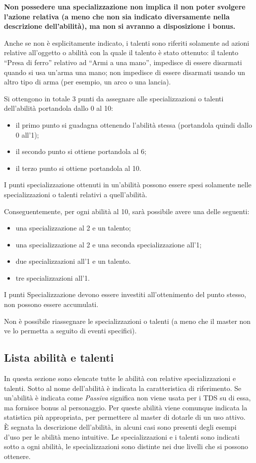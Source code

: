 \documentclass[../manuale_main.tex]{subfiles}
\begin{document}
\textbf{Non possedere una specializzazione non implica il non poter svolgere l'azione relativa (a meno che non sia indicato diversamente nella descrizione dell'abilità), ma non si avranno a disposizione i bonus.}

Anche se non è esplicitamente indicato, i talenti sono riferiti solamente ad azioni relative all'oggetto o abilità con la quale il talento è stato ottenuto: il talento ``Presa di ferro” relativo ad ``Armi a una mano”, impedisce di essere disarmati quando si usa un'arma una mano; non impedisce di essere disarmati usando un altro tipo di arma (per esempio, un arco o una lancia).

Si ottengono in totale 3 punti da assegnare alle specializzazioni o talenti dell'abilità portandola dallo 0 al 10:
\begin{itemize}
\item il primo punto si guadagna ottenendo l'abilità stessa (portandola quindi dallo 0 all'1);
\item il secondo punto si ottiene portandola al 6;
\item il terzo punto si ottiene portandola al 10.
\end{itemize}
I punti specializzazione ottenuti in un'abilità possono essere spesi solamente nelle specializzazioni o talenti relativi a quell'abilità.

Conseguentemente, per ogni abilità al 10, sarà possibile avere una delle seguenti:
\begin{itemize}
\item una specializzazione al 2 e un talento;
\item una specializzazione al 2 e una seconda specializzazione all'1;
\item due specializzazioni all'1 e un talento.
\item tre specializzazioni all'1.
\end{itemize}
I punti Specializzazione devono essere investiti all'ottenimento del punto stesso, non possono essere accumulati.

Non è possibile riassegnare le specializzazioni o talenti (a meno che il master non ve lo permetta a seguito di eventi specifici).

\clearpage
\subsection{Lista abilità e talenti}

In questa sezione sono elencate tutte le abilità con relative specializzazioni e talenti.
Sotto al nome dell'abilità è indicata la caratteristica di riferimento. Se un'abilità è indicata come \emph{Passiva} significa non viene usata per i TDS su di essa, ma fornisce bonus  al personaggio. Per queste abilità viene comunque indicata la statistica più appropriata, per permettere al master di dotarle di un uso attivo.\\
È segnata la descrizione dell'abilità, in alcuni casi sono presenti degli esempi d'uso per le abilità meno intuitive.
Le specializzazioni e i talenti sono indicati sotto a ogni abilità, le specializzazioni sono distinte nei due livelli che si possono ottenere.
\end{document}
